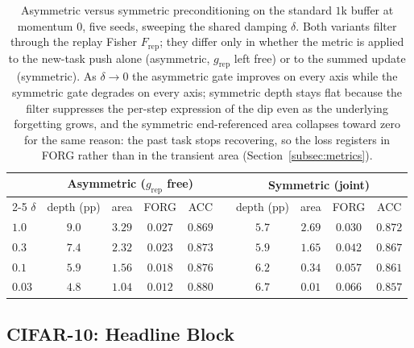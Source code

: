 \begin{table}[H]
    \centering
    \small
    \begin{tabular}{l cccc c cccc}
        \hline
                 & \multicolumn{4}{c}{Asymmetric ($g_{\text{rep}}$ free)} &        & \multicolumn{4}{c}{Symmetric (joint)}                                                        \\
        \cline{2-5}\cline{7-10}
        $\delta$ & depth (pp)                                             & area   & FORG                                  & ACC     &  & depth (pp) & area   & FORG    & ACC     \\
        \hline
        $1.0$    & $9.0$                                                  & $3.29$ & $0.027$                               & $0.869$ &  & $5.7$      & $2.69$ & $0.030$ & $0.872$ \\
        $0.3$    & $7.4$                                                  & $2.32$ & $0.023$                               & $0.873$ &  & $5.9$      & $1.65$ & $0.042$ & $0.867$ \\
        $0.1$    & $5.9$                                                  & $1.56$ & $0.018$                               & $0.876$ &  & $6.2$      & $0.34$ & $0.057$ & $0.861$ \\
        $0.03$   & $4.8$                                                  & $1.04$ & $0.012$                               & $0.880$ &  & $6.7$      & $0.01$ & $0.066$ & $0.857$ \\
        \hline
    \end{tabular}
    \caption{Asymmetric versus symmetric preconditioning on the standard $1$k buffer at momentum $0$, five seeds, sweeping the shared damping $\delta$. Both variants filter through the replay Fisher $F_{\text{rep}}$; they differ only in whether the metric is applied to the new-task push alone (asymmetric, $g_{\text{rep}}$ left free) or to the summed update (symmetric). As $\delta \to 0$ the asymmetric gate improves on every axis while the symmetric gate degrades on every axis; symmetric depth stays flat because the filter suppresses the per-step expression of the dip even as the underlying forgetting grows, and the symmetric end-referenced area collapses toward zero for the same reason: the past task stops recovering, so the loss registers in FORG rather than in the transient area (Section~\ref{subsec:metrics}).}
    \label{tab:res_per_sym}
\end{table}

\subsection{CIFAR-10: Headline Block}
\label{app:cifar_headline_full}

